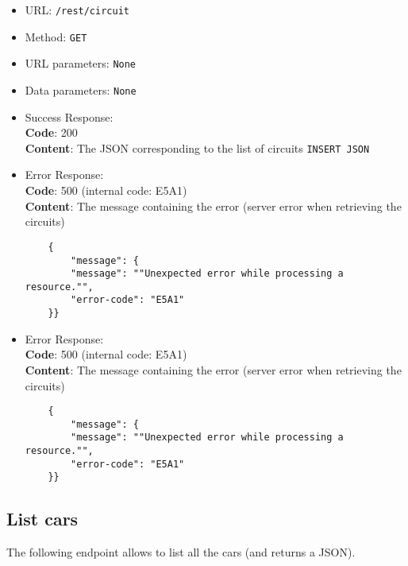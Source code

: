 \begin{itemize}
    \item URL: \texttt{/rest/circuit}
    \item Method: \texttt{GET}
    \item URL parameters: \texttt{None}
    \item Data parameters: \texttt{None}
    \item Success Response: \\
        \textbf{Code}: 200\\
        \textbf{Content}: The JSON corresponding to the list of circuits
        \texttt{INSERT JSON}
    \item Error Response:\\
    \textbf{Code}: 500 (internal code: E5A1)\\
    \textbf{Content}: The message containing the error (server error when retrieving the circuits)\\
    \begin{verbatim}
    {
        "message": {
        "message": ""Unexpected error while processing a resource."",
        "error-code": "E5A1"
    }}
    \end{verbatim}
    \item Error Response:\\
    \textbf{Code}: 500 (internal code: E5A1)\\
    \textbf{Content}: The message containing the error (server error when retrieving the circuits)\\
    \begin{verbatim}
    {
        "message": {
        "message": ""Unexpected error while processing a resource."",
        "error-code": "E5A1"
    }}
    \end{verbatim}
    
\end{itemize}

\subsection*{List cars}

The following endpoint allows to list all the cars (and returns a JSON).


